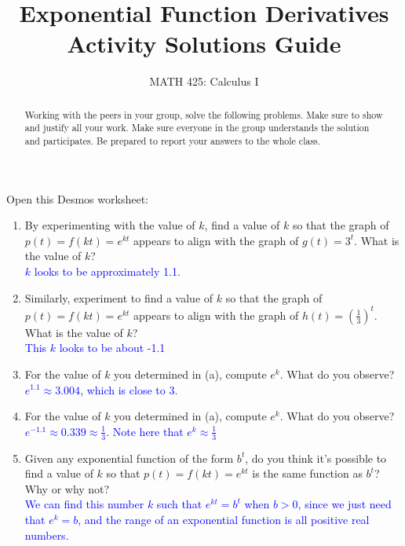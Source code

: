 \documentclass{ximera}
\title{Exponential Function Derivatives Activity Solutions Guide}
\author{MATH 425: Calculus I}
\begin{document}
\begin{abstract}
    Working with the peers in your group, solve the following problems. Make sure to show and justify all your work. Make sure everyone in the group understands the solution and participates. Be prepared to report your answers to the whole class. 
\end{abstract}
\maketitle

\begin{exercise}
    Open this Desmos worksheet: \\
    \begin{center}
    \end{center}

    \begin{enumerate}
        \item By experimenting with the value of $k$, find a value of $k$ so that the graph of $p(t)=f(kt)=e^{kt}$ appears to align with the graph of $g(t)=3^t$.  What is the value of $k$?\\
        \textcolor{blue}{ $k$ looks to be approximately 1.1.}

        \item Similarly, experiment to find a value of $k$ so that the graph of $p(t)=f(kt)=e^{kt}$ appears to align with the graph of $h(t)=(\frac13)^t$.  What is the value of $k$?\\
        \textcolor{blue}{ This $k$ looks to be about -1.1}

        \item For the value of $k$ you determined in (a), compute $e^k$.  What do you observe? \\
        \textcolor{blue}{ $e^{1.1}\approx 3.004$, which is close to 3.  }%
   
        \item For the value of $k$ you determined in (a), compute $e^k$.  What do you observe?  \\
        \textcolor{blue}{ $e^{-1.1}\approx 0.339\approx \frac13$.  Note here that $e^k\approx \frac{1}{3}$}
   
        \item Given any exponential function of the form $b^t$, do you think it's possible to find a value of $k$ so that $p(t)=f(kt)=e^{kt}$ is the same function as $b^t$?  Why or why not?\\
        \textcolor{blue}{ We can find this number $k$ such that $e^{kt}=b^t$ when $b>0$, since we just need that $e^k=b$, and the range of an exponential function is all positive real numbers.}
   

\end{enumerate}
\end{exercise}
\end{document}
